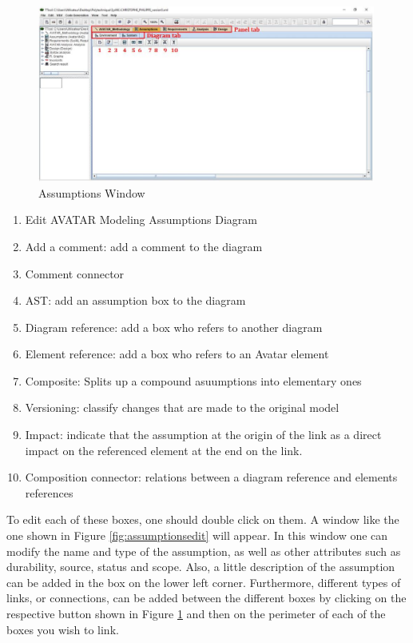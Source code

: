 \documentclass[12pt]{article}
\begin{document}
\begin{figure}[htbp]
\centering
\includegraphics[width=0.99\textwidth]{fig/assumptionswindow.jpg}
\caption{Assumptions Window} \label{fig:assumptionswindow}
\end{figure}

\begin{enumerate}
\item Edit AVATAR Modeling Assumptions Diagram
\item  Add a comment: add a comment to the diagram
\item  Comment connector
\item  AST: add an assumption box to the diagram
\item  Diagram reference: add a box who refers to another diagram
\item  Element reference: add a box who refers to an Avatar element
\item  Composite: Splits up a compound asuumptions into elementary ones
\item  Versioning: classify changes that are made to the original model
\item  Impact: indicate that the assumption at the origin of the link as a direct impact on the referenced element at the end on the link. 
\item Composition connector: relations between a diagram reference and elements references
\end{enumerate}

To edit each of these boxes, one should double click on them. A window like the one shown in Figure \ref{fig:assumptionsedit} will appear. In this window one can modify the name and type of the assumption, as well as other attributes such as durability, source, status and scope. Also, a little description of the assumption can be added in the box on the lower left corner. Furthermore, different types of links, or connections, can be added between the different boxes by clicking on the respective button shown in Figure \ref{fig:assumptionswindow} and then on the perimeter of each of the boxes you wish to link. 
\end{document}
